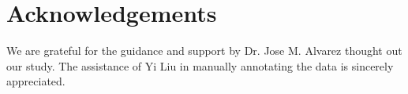 
\chapter*{Acknowledgements}
\label{cha:ack}

We are grateful for the guidance and support by Dr. Jose M. Alvarez thought out our study. The assistance of Yi Liu in manually annotating the data is sincerely appreciated.


